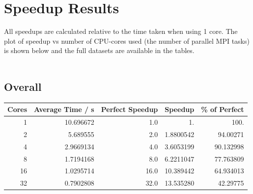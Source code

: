 \documentclass{article}
\begin{document}
\section{Speedup Results}
\label{sec-3}


All speedups are calculated relative to the time taken when using 1
core. The plot of speedup vs number of CPU-cores used (the number of
parallel MPI tasks) is shown below and the full datasets are available
in the tables.
\ \\
\ \\
{\centerline{}}

\subsection{Overall}

\begin{center}
\begin{tabular}{rrrrr}
 Cores  &  Average Time / s  &  Perfect Speedup  &    Speedup  &  \% of Perfect  \\
\hline
     1  &     10.696672  &              1.0  &         1.  &           100.  \\
     2  &      5.689555  &              2.0  &  1.8800542  &       94.00271  \\
     4  &     2.9669134  &              4.0  &  3.6053199  &      90.132998  \\
     8  &     1.7194168  &              8.0  &  6.2211047  &      77.763809  \\
    16  &     1.0295714  &             16.0  &  10.389442  &      64.934013  \\
    32  &     0.7902808  &             32.0  &  13.535280  &       42.29775  \\
\end{tabular}
\end{center}
\end{document}
